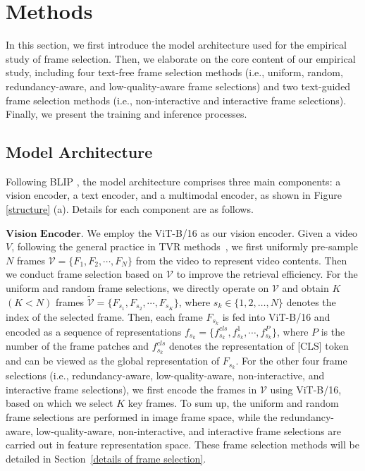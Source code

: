 \documentclass[11pt]{article}
\begin{document}
\section{Methods}

In this section, we first introduce the model architecture used for the empirical study of frame selection. 
Then, we elaborate on the core content of our empirical study, including four text-free frame selection methods (i.e., uniform, random, redundancy-aware, and low-quality-aware frame selections) and two text-guided frame selection methods (i.e., non-interactive and interactive frame selections).
Finally, we present the training and inference processes.

\subsection{Model Architecture}

Following BLIP \cite{li2022blip}, the model architecture comprises three main components: a vision encoder, a text encoder, and a multimodal encoder, as shown in Figure \ref{structure} (a).
Details for each component are as follows.

$\textbf{Vision Encoder.}$ 
We employ the ViT-B/16 \cite{dosovitskiy2020image} as our vision encoder.
Given a video $V$, following the general practice in TVR methods~\cite{lei2021less, luo2022clip4clip}, we first uniformly pre-sample $N$ frames $\mathcal{V}=\{F_1, F_2, \cdots, F_N\}$ from the video to represent video contents.
Then we conduct frame selection based on $\mathcal{V}$ to improve the retrieval efficiency.
For the uniform and random frame selections, we directly operate on $\mathcal{V}$ and obtain $K$ $(K < N)$ frames $\tilde{\mathcal{V}}=\{F_{s_1}, F_{s_2}, \cdots, F_{s_K}\}$, where $s_k \in \{1, 2, \dots, N\}$ denotes the index of the selected frame. 
Then, each frame $F_{s_k}$ is fed into ViT-B/16 and encoded as a sequence of representations $f_{s_k}=\{ f_{s_k}^{cls}, f_{s_k}^{1}, \cdots, f_{s_k}^{P}\}$, where $P$ is the number of the frame patches and $f_{s_k}^{cls}$ denotes the representation of [CLS] token and can be viewed as the global representation of $F_{s_k}$.
For the other four frame selections (i.e., redundancy-aware, low-quality-aware, non-interactive, and interactive frame selections), we first encode the frames in $\mathcal{V}$ using ViT-B/16, %
based on which we select $K$ key frames.
To sum up, the uniform and random frame selections are performed in image frame space, while the redundancy-aware, low-quality-aware, non-interactive, and interactive frame selections are carried out in feature representation space.
These frame selection methods will be detailed in Section~\ref{details of frame selection}.
\end{document}
